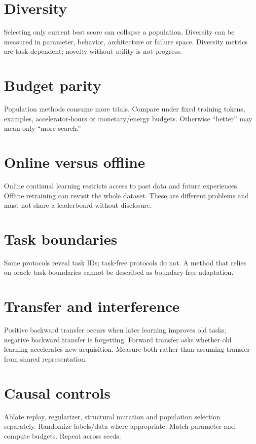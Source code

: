\section{Diversity}
Selecting only current best score can collapse a population. Diversity can be measured in parameter, behavior, architecture or failure space. Diversity metrics are task-dependent; novelty without utility is not progress.

\section{Budget parity}
Population methods consume more trials. Compare under fixed training tokens, examples, accelerator-hours or monetary/energy budgets. Otherwise ``better'' may mean only ``more search.''

\section{Online versus offline}
Online continual learning restricts access to past data and future experiences. Offline retraining can revisit the whole dataset. These are different problems and must not share a leaderboard without disclosure.

\section{Task boundaries}
Some protocols reveal task IDs; task-free protocols do not. A method that relies on oracle task boundaries cannot be described as boundary-free adaptation.

\section{Transfer and interference}
Positive backward transfer occurs when later learning improves old tasks; negative backward transfer is forgetting. Forward transfer asks whether old learning accelerates new acquisition. Measure both rather than assuming transfer from shared representation.

\section{Causal controls}
Ablate replay, regularizer, structural mutation and population selection separately. Randomize labels/data where appropriate. Match parameter and compute budgets. Repeat across seeds.

